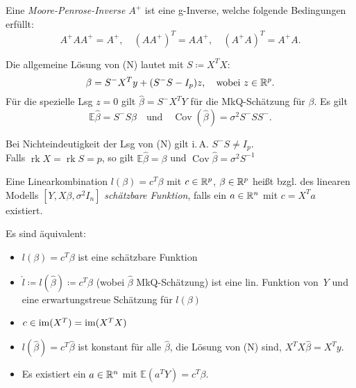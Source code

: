 \documentclass{cheat-sheet}
\newcommand{\E}{\mathbb{E}} %
\DeclareMathOperator{\rk}{rk} %
\DeclareMathOperator{\cov}{Cov} %
\begin{document}
\begin{defn}
  Eine \emph{Moore-Penrose-Inverse} $A^{+}$ ist eine g-Inverse, welche folgende Bedingungen erfüllt:
  \[
    A^{+} A A^{+} = A^{+}, \quad
    (A A^{+})^T = A A^{+}, \quad
    (A^{+} A)^T = A^{+} A.
  \]
\end{defn}


\begin{satz}
  Die allgemeine Lösung von (N) lautet mit $S \coloneqq X^T X$:
  \[
    \beta = S^{-} X^T y + (S^{-} S - I_p) z, \quad
    \text{wobei } z \in \mathbb{R}^p.
  \]
  Für die spezielle Lsg $z = 0$ gilt
  $\hat{\beta} = S^{-} X^T Y$
  für die MkQ-Schätzung für $\beta$.
  Es gilt
  \[
    \E \hat{\beta} = S^{-} S \beta
    \quad \text{und} \quad
    \cov(\hat{\beta}) = \sigma^2 S^{-} S S^{-}.
  \]
\end{satz}

\begin{bem}
  Bei Nichteindeutigkeit der Lsg von (N) gilt i.\,A. $S^{-} S \neq I_p$. \\
  Falls $\rk X = \rk S = p$, so gilt $\E \hat{\beta} = \beta$ und $\cov \hat{\beta} = \sigma^2 S^{-1}$
\end{bem}


\begin{defn}
  Eine Linearkombination $l(\beta) = c^T \beta$ mit $c \in \mathbb{R}^p$, $\beta \in \mathbb{R}^p$ heißt bzgl. des linearen Modells $[Y, X \beta, \sigma^2 I_n]$ \emph{schätzbare Funktion}, falls ein $a \in \mathbb{R}^n$ mit $c = X^T a$ existiert.
\end{defn}


\begin{satz}
  Es sind äquivalent:
  \begin{itemize}
    \item $l(\beta) = c^T \beta$ ist eine schätzbare Funktion
    \item $\hat{l} \coloneqq l(\hat{\beta}) \coloneqq c^T \hat{\beta}$ (wobei $\hat{\beta}$ MkQ-Schätzung) ist eine lin. Funktion von~$Y$ und eine erwartungstreue Schätzung für $l(\beta)$ %
    \item $c \in \operatorname{im}(X^T) = \operatorname{im}(X^T X)$
    \item $l(\hat{\beta}) = c^T \hat{\beta}$ ist konstant für alle $\hat{\beta}$, die Lösung von (N) sind, \dh{} $X^T X \hat{\beta} = X^T y$.
    \item Es existiert ein $a \in \mathbb{R}^n$ mit $\E (a^T Y) = c^T \beta$.
  \end{itemize}
\end{satz}
\end{document}
